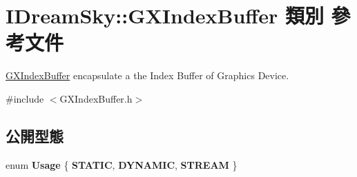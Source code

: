 \hypertarget{class_i_dream_sky_1_1_g_x_index_buffer}{}\section{I\+Dream\+Sky\+:\+:G\+X\+Index\+Buffer 類別 參考文件}
\label{class_i_dream_sky_1_1_g_x_index_buffer}


\hyperlink{class_i_dream_sky_1_1_g_x_index_buffer}{G\+X\+Index\+Buffer} encapsulate a the Index Buffer of Graphics Device.  




{\ttfamily \#include $<$G\+X\+Index\+Buffer.\+h$>$}

\subsection*{公開型態}
\begin{DoxyCompactItemize}
\item 
enum {\bfseries Usage} \{ {\bfseries S\+T\+A\+T\+IC}, 
{\bfseries D\+Y\+N\+A\+M\+IC}, 
{\bfseries S\+T\+R\+E\+AM}
 \}\hypertarget{class_i_dream_sky_1_1_g_x_index_buffer_ab1620b6ab8c318d13327199717bb98c4}{}\label{class_i_dream_sky_1_1_g_x_index_buffer_ab1620b6ab8c318d13327199717bb98c4}

\end{DoxyCompactItemize}

